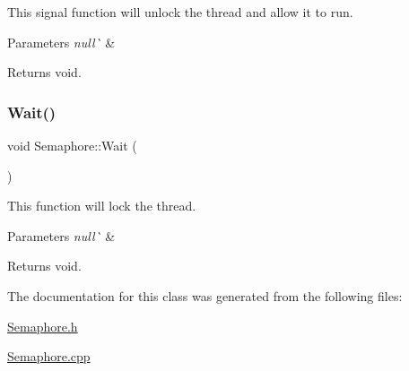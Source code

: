 This signal function will unlock the thread and allow it to run. 


\begin{DoxyParams}{Parameters}
{\em null\`{}} & \\
\hline
\end{DoxyParams}
\begin{DoxyReturn}{Returns}
void. 
\end{DoxyReturn}
\mbox{\label{class_semaphore_a72aabebf026e3a8b1f3e4d0fa8ee1eda}} 
\subsubsection{\texorpdfstring{Wait()}{Wait()}}
{\footnotesize\ttfamily void Semaphore\+::\+Wait (\begin{DoxyParamCaption}{ }\end{DoxyParamCaption})}



This function will lock the thread. 


\begin{DoxyParams}{Parameters}
{\em null\`{}} & \\
\hline
\end{DoxyParams}
\begin{DoxyReturn}{Returns}
void. 
\end{DoxyReturn}


The documentation for this class was generated from the following files\+:\begin{DoxyCompactItemize}
\item 
\mbox{\hyperlink{_semaphore_8h}{Semaphore.\+h}}\item 
\mbox{\hyperlink{_semaphore_8cpp}{Semaphore.\+cpp}}\end{DoxyCompactItemize}
